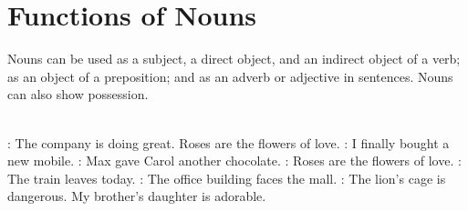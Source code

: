 \chapter{Functions of Nouns}
Nouns can be used as a subject, a direct object, and an indirect object of a verb; as an object of a preposition; and as an adverb or adjective in sentences. Nouns can also show possession.\\\\

\begin{itemize}
    : The company is doing great. Roses are the flowers of love.
    : I finally bought a new mobile.
    : Max gave Carol another chocolate.
    : Roses are the flowers of love.
    : The train leaves today.
    : The office building faces the mall.
    : The lion’s cage is dangerous. My brother’s daughter is adorable.
\end{itemize}